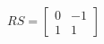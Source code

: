 \documentclass[preview]{standalone}
\begin{document}
\begin{align*}
RS=\begin{bmatrix}0&-1\\1&1\end{bmatrix}
\end{align*}
\end{document}
